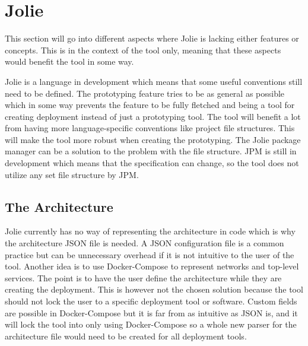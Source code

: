 \section{Jolie}
This section will go into different aspects where Jolie is lacking either features or concepts.
This is in the context of the tool only, meaning that these aspects would benefit the tool in some way.

Jolie is a language in development which means that some useful conventions still need to be defined.
The prototyping feature tries to be as general as possible which in some way prevents the feature to be fully fletched
and being a tool for creating deployment instead of just a prototyping tool.
The tool will benefit a lot from having more language-specific conventions like project file structures.
This will make the tool more robust when creating the prototyping. The Jolie package manager can be a solution
to the problem with the file structure. JPM is still in development which means that the specification can change, so the tool does not utilize any set file structure by JPM.

\subsection{The Architecture}
Jolie currently has no way of representing the architecture in code which is why the architecture JSON file is needed.
A JSON configuration file is a common practice but can be unnecessary overhead if it is not intuitive to the user of the tool.
Another idea is to use Docker-Compose to represent networks and top-level services. The point is to have the user define the architecture while they are creating the deployment.
This is however not the chosen solution because the tool should not lock the user to a specific deployment tool or software.
Custom fields are possible in Docker-Compose but it is far from as intuitive as JSON is, and it will lock the tool into only using Docker-Compose so a whole new 
parser for the architecture file would need to be created for all deployment tools.


